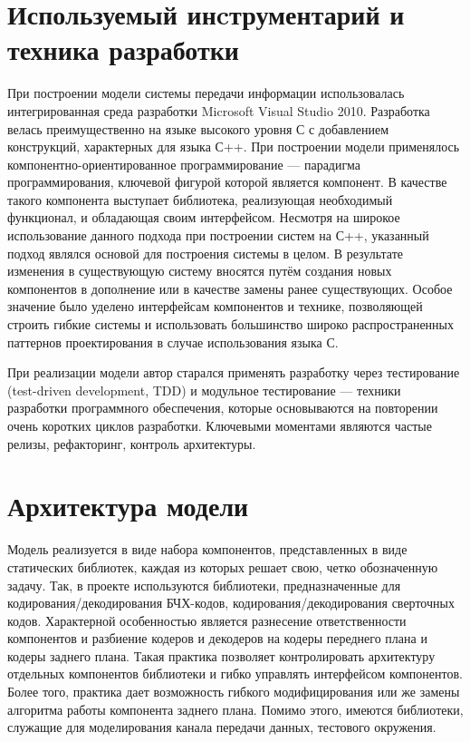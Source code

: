 \section{Используемый инcтрументарий и техника разработки}
При построении модели системы передачи информации использовалась интегрированная среда разработки Microsoft 
Visual Studio 2010. Разработка велась преимущественно на языке высокого уровня С с добавлением конструкций, 
характерных для языка С++. При построении модели применялось компонентно-ориентированное программирование --- 
парадигма программирования, ключевой фигурой которой является компонент. В качестве такого компонента 
выступает библиотека, реализующая необходимый функционал, и обладающая своим интерфейсом. Несмотря на широкое 
использование данного подхода при построении систем на С++, указанный подход являлся основой для построения 
системы в целом. В результате изменения в существующую систему вносятся путём создания новых компонентов в 
дополнение или в качестве замены ранее существующих. Особое значение было уделено интерфейсам компонентов и 
технике, позволяющей строить гибкие системы и использовать большинство широко распространенных паттернов 
проектирования в случае использования языка С.

При реализации модели автор старался применять разработку через тестирование (test-driven development, TDD) и 
модульное тестирование --- техники разработки программного обеспечения, которые основываются на повторении 
очень коротких циклов разработки. Ключевыми моментами являются частые релизы, рефакторинг, контроль 
архитектуры.

\section{Архитектура модели}
Модель реализуется в виде набора компонентов, представленных в виде статических библиотек, каждая из которых 
решает свою, четко обозначенную задачу. Так, в проекте используются библиотеки, предназначенные для 
кодирования/декодирования БЧХ-кодов, кодирования/декодирования сверточных кодов. Характерной особенностью 
является разнесение ответственности компонентов и разбиение кодеров и декодеров на кодеры переднего плана и 
кодеры заднего плана. Такая практика позволяет контролировать архитектуру отдельных компонентов библиотеки и 
гибко управлять интерфейсом компонентов. Более того, практика дает возможность гибкого модифицирования или же 
замены алгоритма работы компонента заднего плана. Помимо этого, имеются библиотеки, служащие для 
моделирования канала передачи данных, тестового окружения.

